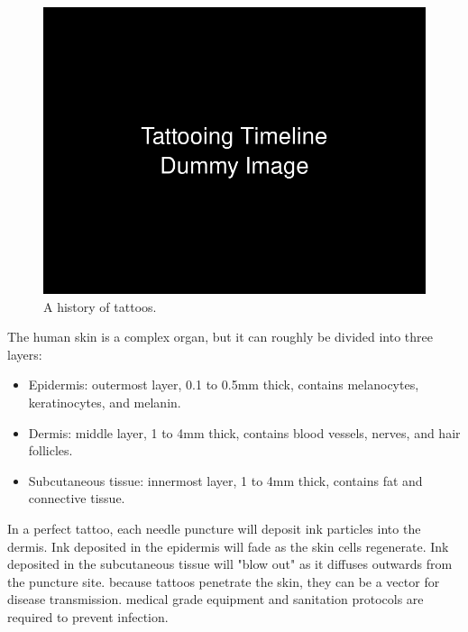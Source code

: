 \documentclass[11pt]{article}
\begin{document}
\begin{figure}
    \vspace{-20pt}
    \includegraphics[width=\linewidth]{figures/timeline.png}
    \caption{A history of tattoos.}
    \label{fig:timeline_biology}
\end{figure}

The human skin is a complex organ, but it can roughly be divided into three layers:

\begin{itemize}
    \item Epidermis: outermost layer, 0.1 to 0.5mm thick, contains melanocytes, keratinocytes, and melanin.
    \item Dermis: middle layer, 1 to 4mm thick, contains blood vessels, nerves, and hair follicles.
    \item Subcutaneous tissue: innermost layer, 1 to 4mm thick, contains fat and connective tissue.
\end{itemize}

In a perfect tattoo, each needle puncture will deposit ink particles into the dermis.
Ink deposited in the epidermis will fade as the skin cells regenerate.
Ink deposited in the subcutaneous tissue will "blow out" as it diffuses outwards from the puncture site.
because tattoos penetrate the skin, they can be a vector for disease transmission.
medical grade equipment and sanitation protocols are required to prevent infection.
\end{document}
